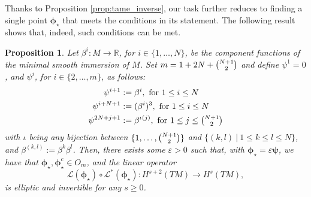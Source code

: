 \documentclass{article}
\newtheorem{proposition}[theorem]{Proposition}
\theoremstyle{remark}
\newcommand{\M}{M}
\begin{document}
Thanks to Proposition \ref{prop:tame_inverse}, our task further reduces to finding a single point $\bm{\phi}_\star$ that meets the conditions in its statement. The following result shows that, indeed, such conditions can be met.
%
\begin{proposition}\label{prop:ellipticity}
    Let $\beta^i:\M\rightarrow\mathbb{R}$, for $i\in\{1,\dots,N\}$, be the component functions of the minimal smooth immersion of $\M$. Set $m=1+2N + \tbinom{N+1}{2}$ and define $\psi^1=0$, and $\psi^{i}$, for $i\in\{2,\ldots,m\}$, as follows:
    \begin{align*}
        \psi^{i+1}&:=\beta^i, \mbox{ for }1\leq i\leq N\\
        \psi^{i+N+1}&:= (\beta^{i})^3, \mbox{ for }1\leq i\leq N\\
\psi^{2N+j+1}&:=\beta^{\iota(j)}, \mbox{ for }1\leq j\leq \tbinom{N+1}{2}
    \end{align*}
 with $\iota$ being any bijection between $\{1,\dots,\tbinom{N+1}{2}\}$ and $\{(k,l)~|~1\leq k\leq l\leq N\}$, and $\beta^{(k,l)} := \beta^k\beta^l$. Then, there exists some $\varepsilon > 0$ such that, with $\bm{\phi}_\star = \varepsilon \bm{\psi}$, we have that $\bm{\phi}_\star,\bm{\phi}_\star^c\in O_m$, and the linear operator
 $$
 \mathcal{L}(\bm{\phi}_\star)\circ\mathcal{L}^*(\bm{\phi}_\star):H^{s+2}(T\M)\rightarrow H^s(T\M),
 $$ 
 is elliptic and invertible for any $s\geq 0$. 
\end{proposition}
%
\end{document}
